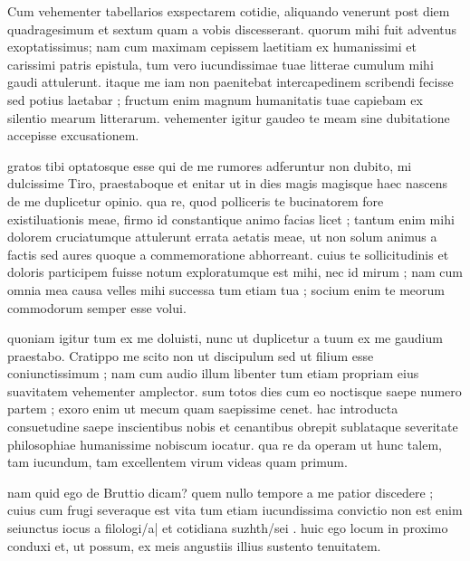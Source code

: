 


 Cum vehementer tabellarios exspectarem cotidie, aliquando venerunt post diem quadragesimum et sextum quam a vobis discesserant. quorum mihi fuit adventus exoptatissimus; nam cum maximam cepissem laetitiam ex humanissimi et carissimi patris epistula, tum vero iucundissimae tuae litterae cumulum mihi gaudi attulerunt. itaque me iam non paenitebat intercapedinem scribendi fecisse sed potius laetabar ; fructum enim magnum humanitatis tuae capiebam ex silentio mearum litterarum. vehementer igitur gaudeo te meam sine dubitatione accepisse excusationem.

 gratos tibi optatosque esse qui de me rumores adferuntur non dubito, mi dulcissime Tiro, praestaboque et enitar ut in dies magis magisque haec nascens de me duplicetur opinio. qua re, quod polliceris te bucinatorem fore existiluationis meae, firmo id constantique animo facias licet ; tantum enim mihi dolorem cruciatumque attulerunt errata aetatis meae, ut non solum animus a factis sed aures quoque a commemoratione abhorreant. cuius te sollicitudinis et doloris participem fuisse notum exploratumque est mihi, nec id mirum ; nam cum omnia mea causa velles mihi successa tum etiam tua ; socium enim te meorum commodorum semper esse volui.

 quoniam igitur tum ex me doluisti, nunc ut duplicetur a tuum ex me gaudium praestabo. Cratippo me scito non ut discipulum sed ut filium esse coniunctissimum ; nam cum audio illum libenter tum etiam propriam eius suavitatem vehementer amplector. sum totos dies cum eo noctisque saepe numero partem ; exoro enim ut mecum quam saepissime cenet. hac introducta consuetudine saepe inscientibus nobis et cenantibus obrepit sublataque severitate philosophiae humanissime nobiscum iocatur. qua re da operam ut hunc talem, tam iucundum, tam excellentem virum videas quam primum.

 nam quid ego de Bruttio dicam? quem nullo tempore a me patior discedere ; cuius cum frugi severaque est vita tum etiam iucundissima convictio non est enim seiunctus iocus a filologi/a| et cotidiana suzhth/sei . huic ego locum in proximo conduxi et, ut possum, ex meis angustiis illius sustento tenuitatem.

